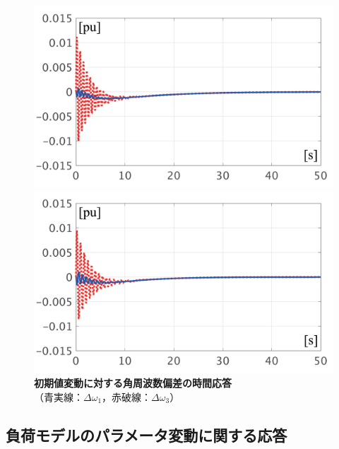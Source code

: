 \documentclass[tombow,dvipdfmx]{corona-a5-1.1}
\begin{document}
\begin{figure}[t]
  \centering
  {
  \begin{minipage}{0.49\linewidth}
    \centering
    \includegraphics[width = 1.0\linewidth]{figs/P1ini}
  \end{minipage}
  \begin{minipage}{0.49\linewidth}
    \centering
    \includegraphics[width = 1.0\linewidth]{figs/P3ini}
  \end{minipage}
  \medskip
  \caption{\textbf{初期値変動に対する角周波数偏差の時間応答}
  \\ \centering（青実線：$\Delta \omega_1$，赤破線：$\Delta \omega_3$）}
  \label{fig:P13ini}
  }
\medskip
\end{figure}

\subsection{負荷モデルのパラメータ変動に関する応答}\label{sec:resldpara}
\end{document}

